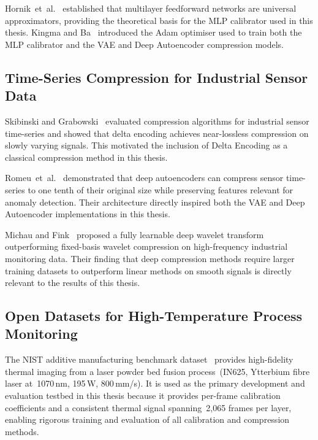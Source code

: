 Hornik~et~al.~\cite{mlp_universal_approx} established that multilayer feedforward networks are universal approximators, providing the theoretical basis for the MLP calibrator used in this thesis. Kingma and Ba~\cite{kingma2014adam} introduced the Adam optimiser used to train both the MLP calibrator and the VAE and Deep Autoencoder compression models.

\subsection{Time-Series Compression for Industrial Sensor Data}

Skibinski and Grabowski~\cite{lossless_compression} evaluated compression algorithms for industrial sensor time-series and showed that delta encoding achieves near-lossless compression on slowly varying signals. This motivated the inclusion of Delta Encoding as a classical compression method in this thesis.

Romeu~et~al.~\cite{autoencoder_compression} demonstrated that deep autoencoders can compress sensor time-series to one tenth of their original size while preserving features relevant for anomaly detection. Their architecture directly inspired both the VAE and Deep Autoencoder implementations in this thesis.

Michau and Fink~\cite{learnable_wavelet} proposed a fully learnable deep wavelet transform outperforming fixed-basis wavelet compression on high-frequency industrial monitoring data. Their finding that deep compression methods require larger training datasets to outperform linear methods on smooth signals is directly relevant to the results of this thesis.

\subsection{Open Datasets for High-Temperature Process Monitoring}

The NIST additive manufacturing benchmark dataset~\cite{nist_dataset} provides high-fidelity thermal imaging from a laser powder bed fusion process~(IN625, Ytterbium fibre laser at~1070\,nm, 195\,W, 800\,mm/s). It is used as the primary development and evaluation testbed in this thesis because it provides per-frame calibration coefficients and a consistent thermal signal spanning~2,065 frames per layer, enabling rigorous training and evaluation of all calibration and compression methods.

\let\cleardoublepage\clearpage
